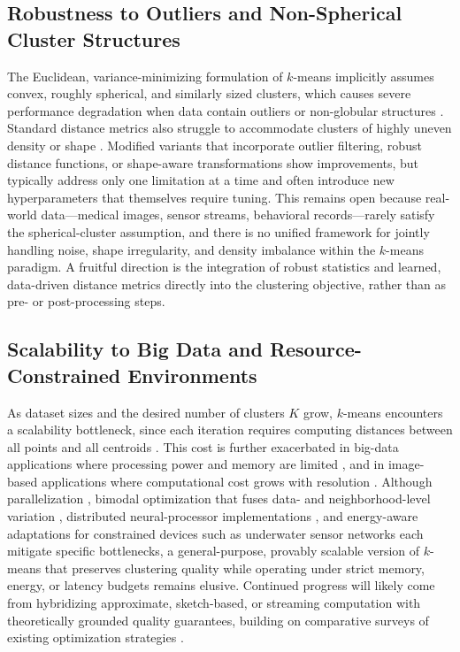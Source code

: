 \subsection{Robustness to Outliers and Non-Spherical Cluster Structures}
The Euclidean, variance-minimizing formulation of $k$-means implicitly assumes convex, roughly spherical, and similarly sized clusters, which causes severe performance degradation when data contain outliers or non-globular structures \cite{shrifan2021adaptive,khan2024addressing}. Standard distance metrics also struggle to accommodate clusters of highly uneven density or shape \cite{raeisi2022distance}. Modified variants that incorporate outlier filtering, robust distance functions, or shape-aware transformations \cite{shrifan2021adaptive,khan2024addressing,shrivastava2014medical} show improvements, but typically address only one limitation at a time and often introduce new hyperparameters that themselves require tuning. This remains open because real-world data---medical images, sensor streams, behavioral records---rarely satisfy the spherical-cluster assumption, and there is no unified framework for jointly handling noise, shape irregularity, and density imbalance within the $k$-means paradigm. A fruitful direction is the integration of robust statistics and learned, data-driven distance metrics directly into the clustering objective, rather than as pre- or post-processing steps.

\subsection{Scalability to Big Data and Resource-Constrained Environments}
As dataset sizes and the desired number of clusters $K$ grow, $k$-means encounters a scalability bottleneck, since each iteration requires computing distances between all points and all centroids \cite{chen2019big,mahdi2021scalable}. This cost is further exacerbated in big-data applications where processing power and memory are limited \cite{awad2022improved}, and in image-based applications where computational cost grows with resolution \cite{lopez2014parallelization}. Although parallelization \cite{lopez2014parallelization}, bimodal optimization that fuses data- and neighborhood-level variation \cite{mussabayev2025bimodalclust}, distributed neural-processor implementations \cite{awad2022improved}, and energy-aware adaptations for constrained devices such as underwater sensor networks \cite{omeke2021dekcs} each mitigate specific bottlenecks, a general-purpose, provably scalable version of $k$-means that preserves clustering quality while operating under strict memory, energy, or latency budgets remains elusive. Continued progress will likely come from hybridizing approximate, sketch-based, or streaming computation with theoretically grounded quality guarantees, building on comparative surveys of existing optimization strategies \cite{mussabayev2023comparative}.


